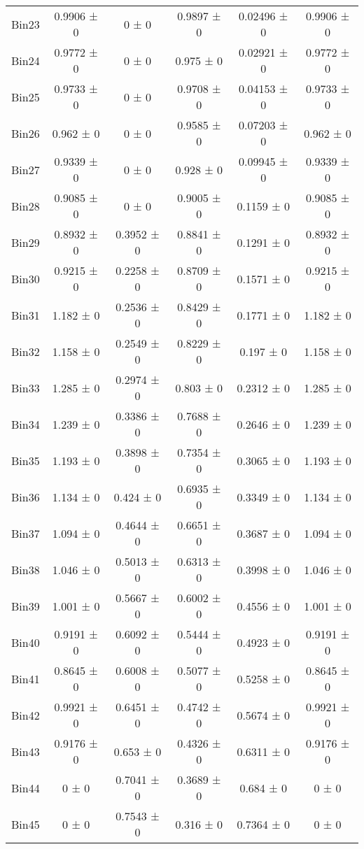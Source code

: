 \begin{tabular}{@{\extracolsep{4pt}}lccccc@{}}
     Bin23 & 0.9906 ± 0 & 0 ± 0 & 0.9897 ± 0 & 0.02496 ± 0 & 0.9906 ± 0 \\ 
     Bin24 & 0.9772 ± 0 & 0 ± 0 & 0.975 ± 0 & 0.02921 ± 0 & 0.9772 ± 0 \\ 
     Bin25 & 0.9733 ± 0 & 0 ± 0 & 0.9708 ± 0 & 0.04153 ± 0 & 0.9733 ± 0 \\ 
     Bin26 & 0.962 ± 0 & 0 ± 0 & 0.9585 ± 0 & 0.07203 ± 0 & 0.962 ± 0 \\ 
     Bin27 & 0.9339 ± 0 & 0 ± 0 & 0.928 ± 0 & 0.09945 ± 0 & 0.9339 ± 0 \\ 
     Bin28 & 0.9085 ± 0 & 0 ± 0 & 0.9005 ± 0 & 0.1159 ± 0 & 0.9085 ± 0 \\ 
     Bin29 & 0.8932 ± 0 & 0.3952 ± 0 & 0.8841 ± 0 & 0.1291 ± 0 & 0.8932 ± 0 \\ 
     Bin30 & 0.9215 ± 0 & 0.2258 ± 0 & 0.8709 ± 0 & 0.1571 ± 0 & 0.9215 ± 0 \\ 
     Bin31 & 1.182 ± 0 & 0.2536 ± 0 & 0.8429 ± 0 & 0.1771 ± 0 & 1.182 ± 0 \\ 
     Bin32 & 1.158 ± 0 & 0.2549 ± 0 & 0.8229 ± 0 & 0.197 ± 0 & 1.158 ± 0 \\ 
     Bin33 & 1.285 ± 0 & 0.2974 ± 0 & 0.803 ± 0 & 0.2312 ± 0 & 1.285 ± 0 \\ 
     Bin34 & 1.239 ± 0 & 0.3386 ± 0 & 0.7688 ± 0 & 0.2646 ± 0 & 1.239 ± 0 \\ 
     Bin35 & 1.193 ± 0 & 0.3898 ± 0 & 0.7354 ± 0 & 0.3065 ± 0 & 1.193 ± 0 \\ 
     Bin36 & 1.134 ± 0 & 0.424 ± 0 & 0.6935 ± 0 & 0.3349 ± 0 & 1.134 ± 0 \\ 
     Bin37 & 1.094 ± 0 & 0.4644 ± 0 & 0.6651 ± 0 & 0.3687 ± 0 & 1.094 ± 0 \\ 
     Bin38 & 1.046 ± 0 & 0.5013 ± 0 & 0.6313 ± 0 & 0.3998 ± 0 & 1.046 ± 0 \\ 
     Bin39 & 1.001 ± 0 & 0.5667 ± 0 & 0.6002 ± 0 & 0.4556 ± 0 & 1.001 ± 0 \\ 
     Bin40 & 0.9191 ± 0 & 0.6092 ± 0 & 0.5444 ± 0 & 0.4923 ± 0 & 0.9191 ± 0 \\ 
     Bin41 & 0.8645 ± 0 & 0.6008 ± 0 & 0.5077 ± 0 & 0.5258 ± 0 & 0.8645 ± 0 \\ 
     Bin42 & 0.9921 ± 0 & 0.6451 ± 0 & 0.4742 ± 0 & 0.5674 ± 0 & 0.9921 ± 0 \\ 
     Bin43 & 0.9176 ± 0 & 0.653 ± 0 & 0.4326 ± 0 & 0.6311 ± 0 & 0.9176 ± 0 \\ 
     Bin44 & 0 ± 0 & 0.7041 ± 0 & 0.3689 ± 0 & 0.684 ± 0 & 0 ± 0 \\ 
     Bin45 & 0 ± 0 & 0.7543 ± 0 & 0.316 ± 0 & 0.7364 ± 0 & 0 ± 0 \\ 

\end{tabular}
